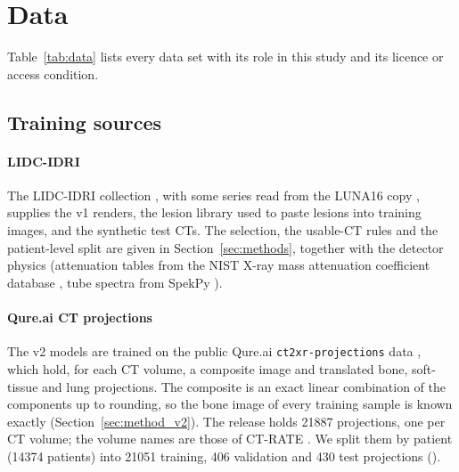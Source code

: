 \section{Data}
\label{sec:data}
Table~\ref{tab:data} lists every data set with its role in this study and its licence or access condition.

\subsection{Training sources}
\paragraph{LIDC-IDRI} The LIDC-IDRI collection \citep{armato2011lidc,armato2015lidctcia,clark2013tcia}, with some series read from the LUNA16 copy
\citep{setio2017luna16}, supplies the v1 renders, the lesion library used to paste lesions into training images, and the synthetic test CTs. The
selection, the usable-CT rules and the patient-level split are given in Section~\ref{sec:methods}, together with the detector physics (attenuation
tables from the NIST X-ray mass attenuation coefficient database \citep{hubbell2004xraymass}, tube spectra from SpekPy \citep{poludniowski2021spekpy}).

\paragraph{Qure.ai CT projections} The v2 models are trained on the public Qure.ai \texttt{ct2xr-projections} data \citep{angaitkar2026anatomy}, which
hold, for each CT volume, a composite image and translated bone, soft-tissue and lung projections. The composite is an exact linear combination of
the components up to rounding, so the bone image of every training sample is known exactly (Section~\ref{sec:method_v2}).
The release holds \num{21887} projections, one per CT volume; the volume names are those of CT-RATE \citep{hamamci2026ctrate}. We split them by
patient (\num{14374} patients) into \num{21051} training, 406 validation and 430 test projections ().

